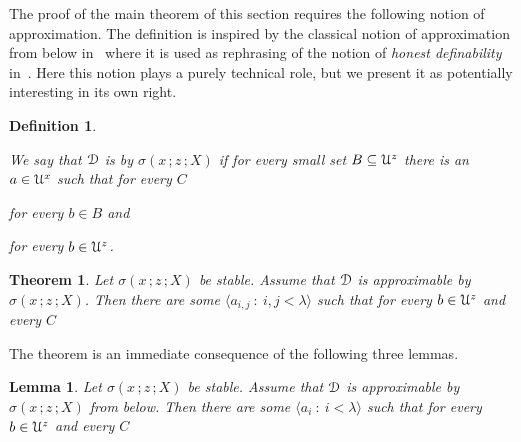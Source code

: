 \documentclass{amsproc}
\makeatletter
\newcounter{thm}
\theoremstyle{mio}
\newtheorem{theorem}[thm]{Theorem}\tcolorboxenvironment{theorem}{mythm}
\newtheorem{lemma}[thm]{Lemma}\tcolorboxenvironment{lemma}{mythm}
\newtheorem{definition}[thm]{Definition}\tcolorboxenvironment{definition}{mythm}
\providecommand{\proofNameStyle}{\bfseries}
\renewenvironment{proof}[1][\proofname]{\par
  \pushQED{\qed}%
  \normalfont%
  \trivlist
  \item[\hskip\labelsep
        \proofNameStyle
    #1\@addpunct{.}]\ignorespaces
}{%
  \popQED\endtrivlist\@endpefalse
}
\renewcommand*{\emph}[1]{%
   \smash{\tikz[baseline]\node[rectangle, fill=teal!25, rounded corners, inner xsep=0.5ex, inner ysep=0.2ex, anchor=base, minimum height = 2.7ex]{\strut #1};}}
\makeatother
\begin{document}
The proof of the main theorem of this section requires the following notion of approximation.
The definition is inspired by the classical notion of approximation from below in~\cite{Z15} where it is used as rephrasing of the notion of \textit{honest definability\/} in~\cite{CS}.
Here this notion plays a purely technical role, but we present it as potentially interesting in its own right.

\begin{definition}\label{def_approx_blw}\strut
  We say that ${\EuScript D}$ is \emph{approximable\/} by $\sigma(x\,;z\,;X)$ \emph{from below\/} if for every small set $B\subseteq{\EuScript U}^z$ there is an $a\in{\EuScript U}^x$ such that for every $C$\smallskip

  \hfill for every $b\in B$ and\smallskip

  \hfill for every $b\in{\EuScript U}^z$.\smallskip
\end{definition}


\begin{theorem}\label{thm_stability_definability}
  Let $\sigma(x\,;z\,;X)$ be stable.
  Assume that ${\EuScript D}$ is approximable by $\sigma(x\,;z\,;X)$.
  Then there are some $\langle a_{i,j}\ :\ i,j<\lambda\rangle$ such that for every $b\in{\EuScript U}^z$ and every $C$\medskip

  \medskip

\end{theorem}

\begin{proof}
  The theorem is an immediate consequence of the following three lemmas.
\end{proof}

\begin{lemma}\label{lem_1_inf}
  Let $\sigma(x\,;z\,;X)$ be stable.
  Assume that ${\EuScript D}$ is approximable by $\sigma(x\,;z\,;X)$ from below.
  Then there are some $\langle a_i\ :\ i<\lambda\rangle$ such that for every $b\in{\EuScript U}^z$ and every $C$\medskip

  \medskip 

\end{lemma}
\end{document}
